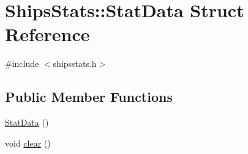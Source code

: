 \hypertarget{struct_ships_stats_1_1_stat_data}{}\section{Ships\+Stats\+::Stat\+Data Struct Reference}
\label{struct_ships_stats_1_1_stat_data}


{\ttfamily \#include $<$shipsstats.\+h$>$}

\subsection*{Public Member Functions}
\begin{DoxyCompactItemize}
\item 
\mbox{\hyperlink{struct_ships_stats_1_1_stat_data_a845e7985d983968c880a3e7d50257463}{Stat\+Data}} ()
\item 
void \mbox{\hyperlink{struct_ships_stats_1_1_stat_data_a1ce3c55a72413eb64a5a73576631f01c}{clear}} ()
\end{DoxyCompactItemize}
